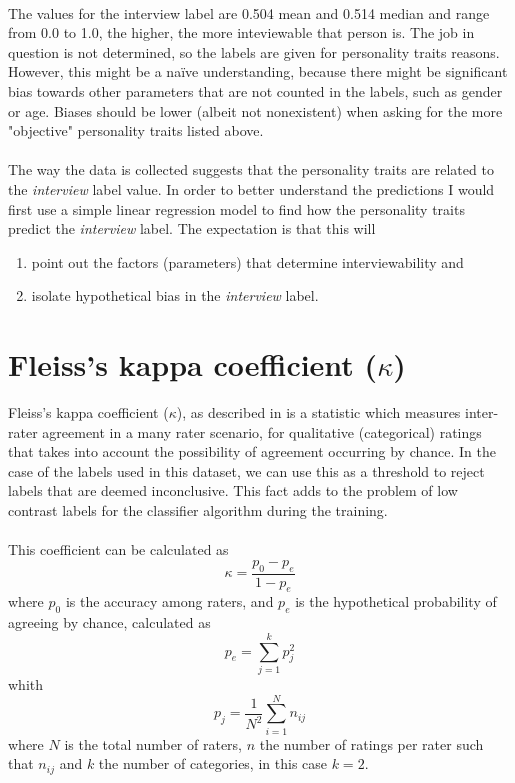 \documentclass[12pt,a4paper]{report}
\begin{document}
\paragraph{}The values for the interview label are 0.504 mean and 0.514 median and range from 0.0 to 1.0, the higher, the more inteviewable that person is. The job in question is not determined, so the labels are given for personality traits reasons. However, this might be a naïve understanding, because there might be significant bias towards other parameters that are not counted in the labels, such as gender or age. Biases should be lower (albeit not nonexistent) when asking for the more "objective" personality traits listed above.

\paragraph{} The way the data is collected suggests that the personality traits are related to the \emph{interview} label value. In order to better understand the predictions I would first use a simple linear regression model to find how the personality traits predict the \emph{interview} label. The expectation is that this will
\begin{enumerate}
\item point out the factors (parameters) that determine interviewability and
\item isolate hypothetical bias in the \emph{interview} label.
\end{enumerate}

\section{Fleiss's kappa coefficient ($\kappa$)} Fleiss's kappa coefficient ($\kappa$), as described in \cite{fleisskappa} is a statistic which measures inter-rater agreement in a many rater scenario, for qualitative (categorical) ratings that takes into account the possibility of agreement occurring by chance. In the case of the labels used in this dataset, we can use this as a threshold to reject labels that are deemed inconclusive. This fact adds to the problem of low contrast labels for the classifier algorithm during the training.

\paragraph{}This coefficient can be calculated as $$\kappa = \frac{p_0-p_e}{1-p_e}$$ where $p_0$ is the accuracy among raters, and $p_e$ is the hypothetical probability of agreeing by chance, calculated as $$p_e=  \sum_{j=1}^k p_{j}^2$$ whith $$p_j = \frac{1}{N^2}\sum_{i=1}^N n_{ij}$$ where $N$ is the total number of raters, $n$ the number of ratings per rater such that $n_{ij}$ and $k$ the number of categories, in this case $k=2$.
\end{document}
